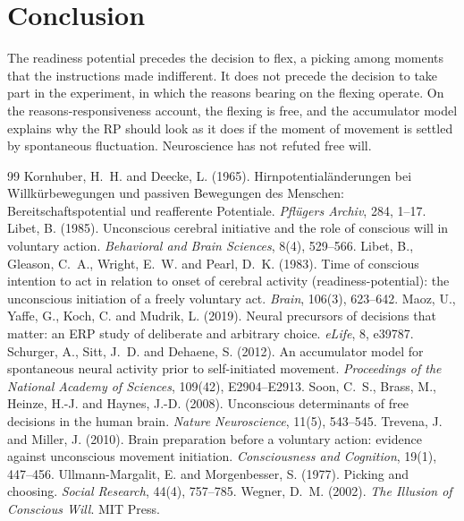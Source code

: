 \documentclass{situationist-preprint}
\begin{document}
\section{Conclusion}

The readiness potential precedes the decision to flex, a picking among moments that the instructions made indifferent. It does not precede the decision to take part in the experiment, in which the reasons bearing on the flexing operate. On the reasons-responsiveness account, the flexing is free, and the accumulator model explains why the RP should look as it does if the moment of movement is settled by spontaneous fluctuation. Neuroscience has not refuted free will.

\begin{thebibliography}{99}\small
{} Kornhuber, H.~H. and Deecke, L. (1965). Hirnpotential\"anderungen bei Willk\"urbewegungen und passiven Bewegungen des Menschen: Bereitschaftspotential und reafferente Potentiale. \emph{Pfl\"ugers Archiv}, 284, 1--17.
 Libet, B. (1985). Unconscious cerebral initiative and the role of conscious will in voluntary action. \emph{Behavioral and Brain Sciences}, 8(4), 529--566.
 Libet, B., Gleason, C.~A., Wright, E.~W. and Pearl, D.~K. (1983). Time of conscious intention to act in relation to onset of cerebral activity (readiness-potential): the unconscious initiation of a freely voluntary act. \emph{Brain}, 106(3), 623--642.
 Maoz, U., Yaffe, G., Koch, C. and Mudrik, L. (2019). Neural precursors of decisions that matter: an ERP study of deliberate and arbitrary choice. \emph{eLife}, 8, e39787.
 Schurger, A., Sitt, J.~D. and Dehaene, S. (2012). An accumulator model for spontaneous neural activity prior to self-initiated movement. \emph{Proceedings of the National Academy of Sciences}, 109(42), E2904--E2913.
 Soon, C.~S., Brass, M., Heinze, H.-J. and Haynes, J.-D. (2008). Unconscious determinants of free decisions in the human brain. \emph{Nature Neuroscience}, 11(5), 543--545.
 Trevena, J. and Miller, J. (2010). Brain preparation before a voluntary action: evidence against unconscious movement initiation. \emph{Consciousness and Cognition}, 19(1), 447--456.
 Ullmann-Margalit, E. and Morgenbesser, S. (1977). Picking and choosing. \emph{Social Research}, 44(4), 757--785.
 Wegner, D.~M. (2002). \emph{The Illusion of Conscious Will}. MIT Press.
\end{thebibliography}
\end{document}
